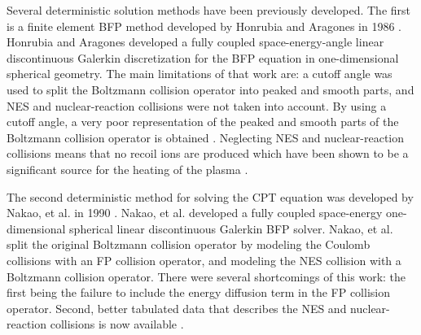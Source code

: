 Several deterministic solution methods have been previously developed. The first is a finite element BFP method developed by Honrubia and Aragones in 1986 \cite{Honrubia-1986}. Honrubia and Aragones developed a fully coupled space-energy-angle linear discontinuous Galerkin discretization for the BFP equation in one-dimensional spherical geometry. The main limitations of that work are: a cutoff angle was used to split the Boltzmann collision operator into peaked and smooth parts, and NES and nuclear-reaction collisions were not taken into account. By using a cutoff angle, a very poor representation of the peaked and smooth parts of the Boltzmann collision operator is obtained \cite{Landesman-1989}. Neglecting NES and nuclear-reaction collisions  means that no recoil ions are produced which have been shown to be a significant source for the heating of the plasma \cite{Nakao-1988}.

The second deterministic method for solving the CPT equation was developed by Nakao, et al. in 1990 \cite{Nakao-1990}. Nakao, et al. developed a fully coupled space-energy one-dimensional spherical linear discontinuous Galerkin BFP solver. Nakao, et al. split the original Boltzmann collision operator by modeling the Coulomb collisions with an FP collision operator, and modeling the NES collision with a Boltzmann collision operator. There were several shortcomings of this work: the first being the failure to include the energy diffusion term in the FP collision operator. Second, better tabulated data that describes the NES and nuclear-reaction collisions is now available \cite{Hale-1983}. 